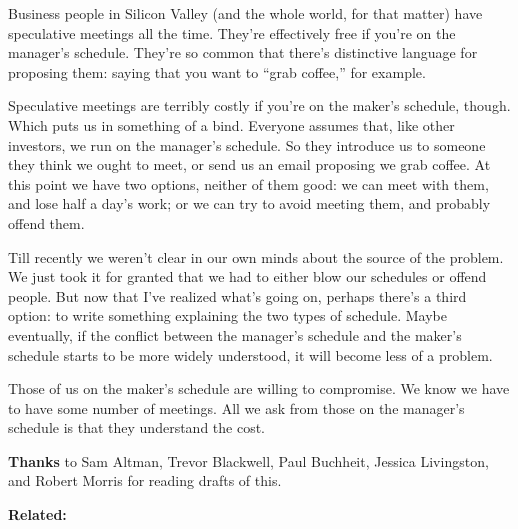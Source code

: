 Business people in Silicon Valley (and the whole world, for that matter)
have speculative meetings all the time. They're effectively free if
you're on the manager's schedule. They're so common that there's
distinctive language for proposing them: saying that you want to ``grab
coffee,'' for example.

Speculative meetings are terribly costly if you're on the maker's
schedule, though. Which puts us in something of a bind. Everyone assumes
that, like other investors, we run on the manager's schedule. So they
introduce us to someone they think we ought to meet, or send us an email
proposing we grab coffee. At this point we have two options, neither of
them good: we can meet with them, and lose half a day's work; or we can
try to avoid meeting them, and probably offend them.

Till recently we weren't clear in our own minds about the source of the
problem. We just took it for granted that we had to either blow our
schedules or offend people. But now that I've realized what's going on,
perhaps there's a third option: to write something explaining the two
types of schedule. Maybe eventually, if the conflict between the
manager's schedule and the maker's schedule starts to be more widely
understood, it will become less of a problem.

Those of us on the maker's schedule are willing to compromise. We know
we have to have some number of meetings. All we ask from those on the
manager's schedule is that they understand the cost.

\textbf{Thanks} to Sam Altman, Trevor Blackwell, Paul Buchheit, Jessica
Livingston, and Robert Morris for reading drafts of this.

\textbf{Related:}